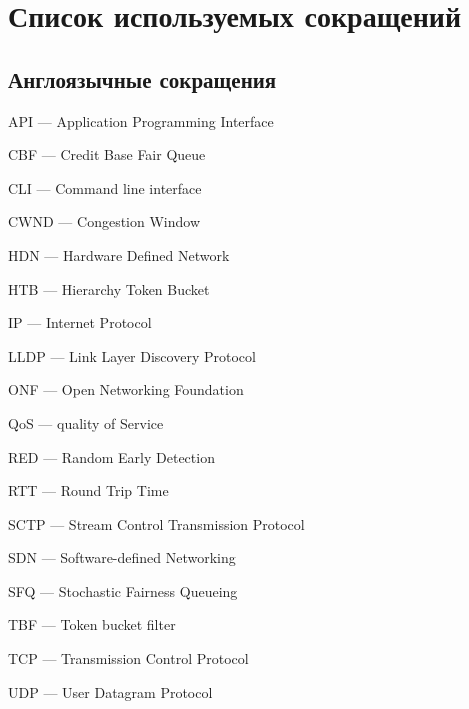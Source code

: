 \chapter*{Список используемых сокращений}

\section*{Англоязычные сокращения}

\mbox{}

API --- Application Programming Interface %

CBF --- Credit Base Fair Queue

CLI --- Command line interface %

CWND --- Congestion Window %

HDN --- Hardware Defined Network %

HTB --- Hierarchy Token Bucket

IP --- Internet Protocol

LLDP --- Link Layer Discovery Protocol

ONF --- Open Networking Foundation

QoS --- quality of Service %

RED --- Random Early Detection

RTT --- Round Trip Time

SCTP --- Stream Control Transmission Protocol %

SDN --- Software-defined Networking

SFQ --- Stochastic Fairness Queueing

TBF --- Token bucket filter

TCP --- Transmission Control Protocol %

UDP --- User Datagram Protocol %
